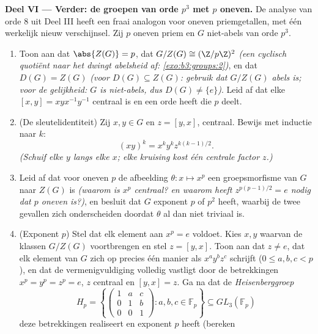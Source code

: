 \begin{problem}
\medskip
\noindent\textbf{Deel VI --- Verder: de groepen van orde $p^3$ met
$p$ oneven.} De analyse van orde $8$ uit Deel III heeft een fraai
analogon voor oneven priemgetallen, met één werkelijk nieuw
verschijnsel. Zij $p$ oneven priem en $G$ niet-abels van orde
$p^3$.
\begin{enumerate}[resume]
  \item Toon aan dat $\abs{Z(G)} = p$, dat $G/Z(G) \cong
        (\Z/p\Z)^2$ \emph{(een cyclisch quotiënt naar het 
        dwingt abelsheid af: \cref{exo:b3:groups:2})}, en dat
        $D(G) = Z(G)$ \emph{(voor $D(G) \subseteq Z(G)$: gebruik
        dat $G/Z(G)$ abels is; voor de gelijkheid: $G$ is
        niet-abels, dus $D(G) \neq \{e\}$)}. Leid af dat elke
         $[x, y] = xyx^{-1}y^{-1}$ centraal is en een
        orde heeft die $p$ deelt.
  \item (De sleutelidentiteit) Zij $x, y \in G$ en $z = [y, x]$,
        centraal. Bewijs met inductie naar $k$:
        \[
        (xy)^k = x^k y^k z^{k(k-1)/2} .
        \]
        \emph{(Schuif elke $y$ langs elke $x$; elke kruising kost
        één centrale factor $z$.)}
  \item Leid af dat voor oneven $p$ de afbeelding $\theta\colon x
        \mapsto x^p$ een groepsmorfisme van $G$ naar $Z(G)$ is
        \emph{(waarom is $x^p$ centraal? en waarom heeft
        $z^{p(p-1)/2} = e$ nodig dat $p$ oneven is?)}, en besluit
        dat $G$ exponent $p$ of $p^2$ heeft, waarbij de twee
        gevallen zich onderscheiden doordat $\theta$ al dan niet
        triviaal is.
  \item (Exponent $p$) Stel dat elk element aan $x^p = e$ voldoet.
        Kies $x, y$ waarvan de klassen $G/Z(G)$ voortbrengen en
        stel $z = [y, x]$. Toon aan dat $z \neq e$, dat elk element
        van $G$ zich op precies één manier als $x^ay^bz^c$ schrijft
        ($0 \leq a, b, c < p$), en dat de vermenigvuldiging
        volledig vastligt door de betrekkingen $x^p = y^p = z^p =
        e$, $z$ centraal en $[y, x] = z$. Ga na dat de
        \emph{Heisenberggroep}
        \[
        H_p = \left\{
        \begin{pmatrix} 1 & a & c\\ 0 & 1 & b\\ 0 & 0 & 1
        \end{pmatrix} : a, b, c \in \mathbb F_p \right\}
        \subseteq GL_3(\mathbb F_p)
        \]
        deze betrekkingen realiseert en exponent $p$ heeft (bereken

\end{enumerate}
\end{problem}
